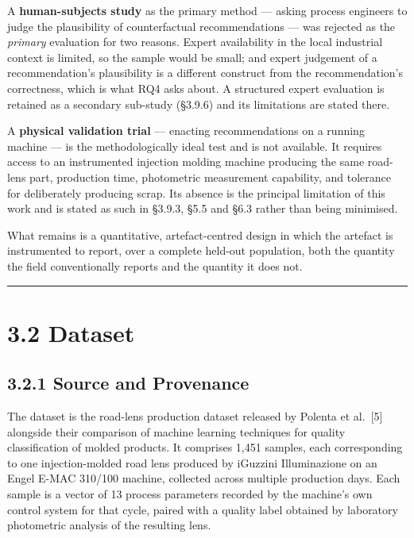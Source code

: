 A \textbf{human-subjects study} as the primary method --- asking process engineers to judge the plausibility of counterfactual recommendations --- was rejected as the \emph{primary} evaluation for two reasons. Expert availability in the local industrial context is limited, so the sample would be small; and expert judgement of a recommendation's plausibility is a different construct from the recommendation's correctness, which is what RQ4 asks about. A structured expert evaluation is retained as a secondary sub-study (§3.9.6) and its limitations are stated there.

A \textbf{physical validation trial} --- enacting recommendations on a running machine --- is the methodologically ideal test and is not available. It requires access to an instrumented injection molding machine producing the same road-lens part, production time, photometric measurement capability, and tolerance for deliberately producing scrap. Its absence is the principal limitation of this work and is stated as such in §3.9.3, §5.5 and §6.3 rather than being minimised.

What remains is a quantitative, artefact-centred design in which the artefact is instrumented to report, over a complete held-out population, both the quantity the field conventionally reports and the quantity it does not.

\begin{center}\rule{0.5\linewidth}{0.5pt}\end{center}

\hypertarget{dataset}{%
\section{3.2 Dataset}\label{dataset}}

\hypertarget{source-and-provenance}{%
\subsection{3.2.1 Source and Provenance}\label{source-and-provenance}}

The dataset is the road-lens production dataset released by Polenta et al.~{[}5{]} alongside their comparison of machine learning techniques for quality classification of molded products. It comprises 1,451 samples, each corresponding to one injection-molded road lens produced by iGuzzini Illuminazione on an Engel E-MAC 310/100 machine, collected across multiple production days. Each sample is a vector of 13 process parameters recorded by the machine's own control system for that cycle, paired with a quality label obtained by laboratory photometric analysis of the resulting lens.

